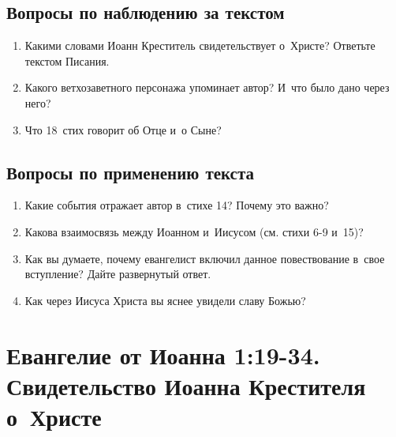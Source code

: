 \documentclass[a4paper,12pt]{article}
\begin{document}
\subsection*{Вопросы по наблюдению за текстом}
\begin{enumerate}
    \item Какими словами Иоанн Креститель свидетельствует о~Христе? Ответьте текстом Писания. 
    
    \myline
    
    \myline

    \item Какого ветхозаветного персонажа упоминает автор? И~что было дано через него? 
    
    \myline
    
    \myline
    \item Что 18~стих говорит об Отце и~о Сыне?
    
    \myline
    
    \myline
\end{enumerate}

\subsection*{Вопросы по применению текста} 
\begin{enumerate}
    \item Какие события отражает автор в~стихе 14? Почему это важно?
    
    \myline
    
    \myline
    \item Какова взаимосвязь между Иоанном и~Иисусом (см. стихи 6-9 и~15)? 
    
    \myline
    
    \myline
    \item Как вы думаете, почему евангелист включил данное повествование в~свое вступление? Дайте развернутый ответ. 
    
    \myline
    
    \myline
    \item Как через Иисуса Христа вы яснее увидели славу Божью?
    
    \myline
    
    \myline
\end{enumerate}



\section{Евангелие от Иоанна 1:19-34. Свидетельство Иоанна Крестителя о~Христе}
\end{document}
